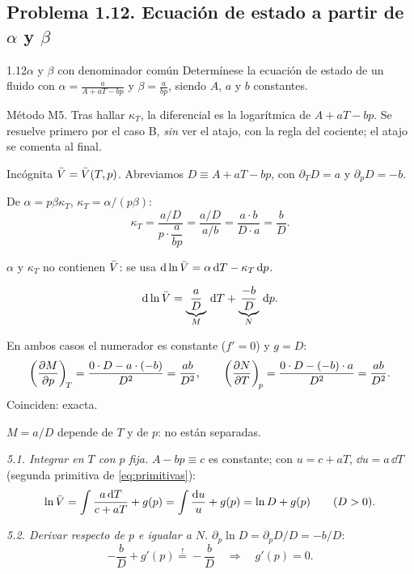 \subsection{Problema 1.12. Ecuación de estado a partir de \texorpdfstring{$\alpha$}{alpha} y \texorpdfstring{$\beta$}{beta}}
\begin{problema}{1.12}{$\alpha$ y $\beta$ con denominador común}
Determínese la ecuación de estado de un fluido con $\displaystyle\alpha=\frac{a}{A+aT-bp}$ y
$\displaystyle\beta=\frac{a}{bp}$, siendo $A$, $a$ y $b$ constantes.
\end{problema}

\begin{resolucion}
\idea Método M5. Tras hallar $\kappa_T$, la diferencial es la logarítmica de $A+aT-bp$. Se resuelve
primero por el caso B, \emph{sin} ver el atajo, con la regla del cociente; el atajo se comenta al final.

 Incógnita $\bar{V}=\bar{V}(T,p)$. Abreviamos $D\equiv A+aT-bp$, con
$\partial_TD=a$ y $\partial_pD=-b$.

 De $\alpha=p\beta\kappa_T$, $\kappa_T=\alpha/(p\beta)$:
\[
  \kappa_T=\frac{a/D}{p\cdot\dfrac{a}{bp}}=\frac{a/D}{a/b}=\frac{a\cdot b}{D\cdot a}=\frac{b}{D}.
\]

 $\alpha$ y $\kappa_T$ no contienen $\bar{V}$: se usa
$\mathrm{d}\ln\bar{V}=\alpha\,\mathrm{d} T-\kappa_T\,\mathrm{d} p$.

\[
  \mathrm{d}\ln\bar{V}=\underbrace{\frac{a}{D}}_{M}\,\mathrm{d} T+\underbrace{\frac{-b}{D}}_{N}\,\mathrm{d} p.
\]

 En ambos casos el numerador es constante ($f'=0$) y
$g=D$:
\[
  \left(\frac{\partial M}{\partial p}\right)_{\!T}=\frac{0\cdot D-a\cdot(-b)}{D^2}=\frac{ab}{D^2},\qquad
  \left(\frac{\partial N}{\partial T}\right)_{\!p}=\frac{0\cdot D-(-b)\cdot a}{D^2}=\frac{ab}{D^2}.
\]
Coinciden: exacta.

 $M=a/D$ depende de $T$ y de $p$: no están separadas.

\emph{5.1. Integrar en $T$ con $p$ fija.} $A-bp\equiv c$ es constante; con $u=c+aT$, $\dd u=a\,\dd T$
(segunda primitiva de \eqref{eq:primitivas}):
\[
  \ln\bar{V}=\int\frac{a\,\mathrm{d} T}{c+aT}+g(p)=\int\frac{\mathrm{d} u}{u}+g(p)=\ln D+g(p)\qquad(D>0).
\]

\emph{5.2. Derivar respecto de $p$ e igualar a $N$.} $\partial_p\ln D=\partial_pD/D=-b/D$:
\[
  -\frac bD+g'(p)\stackrel{!}{=}-\frac bD\quad\Longrightarrow\quad g'(p)=0.
\]


\end{resolucion}
